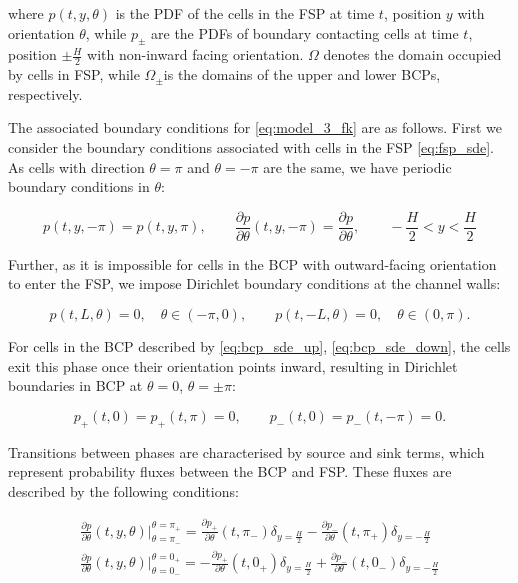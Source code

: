 where $p(t, y, \theta)$ is the PDF of the cells in the FSP at time $t$, position $y$ with orientation $\theta$, while
 $p_\pm$ are the PDFs 
of boundary contacting cells at time $t$, position $\pm \frac{H}{2}$ with non-inward facing orientation. $\Omega$ 
denotes the domain occupied by cells in FSP, while $\Omega_\pm$is the domains of the 
upper and lower BCPs, respectively. 

The associated boundary conditions for \eqref{eq:model_3_fk} are as follows. First we consider the boundary
conditions associated with cells in the FSP \eqref{eq:fsp_sde}. As 
cells with direction $\theta = \pi$ and $\theta = -\pi$ are the same, we have periodic boundary 
conditions in $\theta$:

\begin{equation}
    p(t, y, -\pi) = p(t, y, \pi), \qquad \frac{\partial p}{\partial \theta}(t, y, -\pi) = \frac{\partial p}{\partial \theta},  \qquad -\frac{H}{2} < y < \frac{H}{2}
\end{equation}

Further, as it is impossible for cells in the BCP with outward-facing orientation to enter 
the FSP, we impose Dirichlet boundary conditions at the channel walls:

\begin{equation}
    p(t, L, \theta) = 0, \quad \theta \in (-\pi, 0), \qquad p(t, -L, \theta) = 0, \quad \theta \in (0, \pi).
\end{equation}

For cells in the BCP described by \eqref{eq:bcp_sde_up}, \eqref{eq:bcp_sde_down}, the cells exit this phase once
their orientation points inward, resulting in Dirichlet boundaries in BCP at
$\theta = 0$, $\theta = \pm \pi$:

\begin{equation}
    p_+(t, 0) = p_+(t, \pi) = 0, \qquad p_-(t, 0) = p_-(t, -\pi) = 0.
\end{equation}

Transitions between phases are characterised by source and sink terms, which represent probability 
fluxes between the BCP and FSP. These fluxes are described by the following conditions:

\begin{subequations}
    \begin{align}
        \frac{\partial p}{\partial \theta}(t, y, \theta)\Bigr|_{\theta=\pi_-}^{\theta = \pi_+} = 
        \frac{\partial p_+}{\partial \theta}(t, \pi_-)\delta_{y = \frac{H}{2}} 
        - \frac{\partial p_-}{\partial \theta}(t, \pi_+)\delta_{y=-\frac{H}{2}}\\
        \frac{\partial p}{\partial \theta}(t, y, \theta)\Bigr|_{\theta=0_-}^{\theta = 0_+} = 
        -\frac{\partial p_+}{\partial \theta}(t, 0_+)\delta_{y = \frac{H}{2}} 
        + \frac{\partial p_-}{\partial \theta}(t, 0_-)\delta_{y=-\frac{H}{2}}
    \end{align}
\end{subequations}

